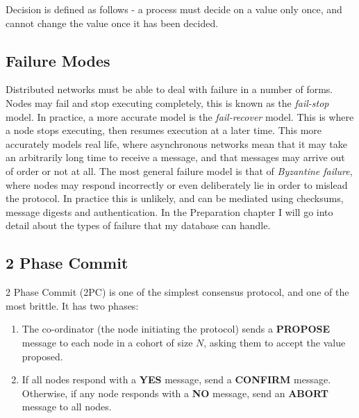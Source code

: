 \documentclass[12pt,twoside,notitlepage]{report}
\newcommand{\msg}[1] {{\bf #1}}
\begin{document}
Decision is defined as follows - a process must decide on a value only once, and cannot change the
value once it has been decided.

\subsection*{Failure Modes}

Distributed networks must be able to deal with failure in a number of forms. Nodes may fail and
stop executing completely, this is known as the \emph{fail-stop} model. In practice, a more accurate
model is the \emph{fail-recover} model. This is where a node stops executing, then resumes execution
at a later time. This more accurately models real life, where asynchronous networks mean that it
may take an arbitrarily long time to receive a message, and that messages may arrive out of order
or not at all. The most general failure model is that of \emph{Byzantine failure}, where nodes may
respond incorrectly or even deliberately lie in order to mislead the protocol. In practice this is
unlikely, and can be mediated using checksums, message digests and authentication. In the
Preparation chapter I will go into detail about the types of failure that my database can handle.

\subsection*{2 Phase Commit}

2 Phase Commit (2PC) is one of the simplest consensus protocol, and one of the most brittle. It
has two phases:

\begin{enumerate}
\item The co-ordinator (the node initiating the protocol) sends a \msg{PROPOSE} message to each
	node in a cohort of size $N$, asking them to accept the value proposed.
\item If all nodes respond with a \msg{YES} message, send a \msg{CONFIRM} message. Otherwise, if
	any node responds with a \msg{NO} message, send an \msg{ABORT} message to all nodes.
\end{enumerate}
\end{document}
